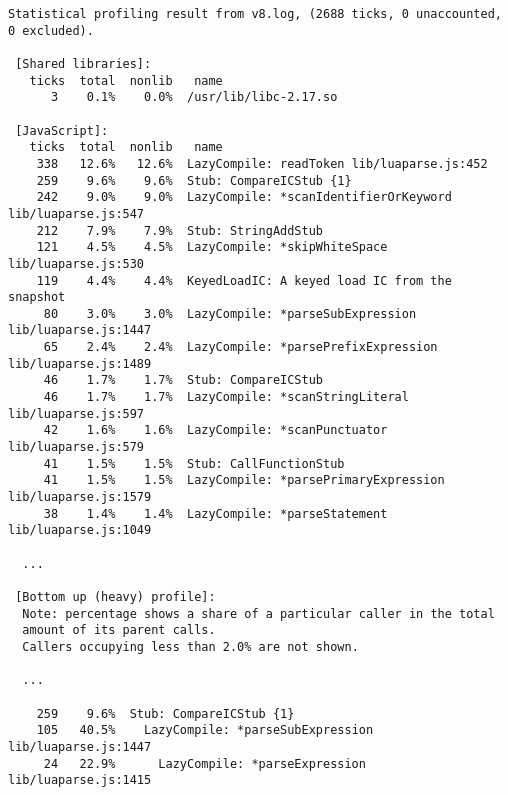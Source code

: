 \footnotesize
\begin{verbatim}
Statistical profiling result from v8.log, (2688 ticks, 0 unaccounted, 0 excluded).

 [Shared libraries]:
   ticks  total  nonlib   name
      3    0.1%    0.0%  /usr/lib/libc-2.17.so

 [JavaScript]:
   ticks  total  nonlib   name
    338   12.6%   12.6%  LazyCompile: readToken lib/luaparse.js:452
    259    9.6%    9.6%  Stub: CompareICStub {1}
    242    9.0%    9.0%  LazyCompile: *scanIdentifierOrKeyword lib/luaparse.js:547
    212    7.9%    7.9%  Stub: StringAddStub
    121    4.5%    4.5%  LazyCompile: *skipWhiteSpace lib/luaparse.js:530
    119    4.4%    4.4%  KeyedLoadIC: A keyed load IC from the snapshot
     80    3.0%    3.0%  LazyCompile: *parseSubExpression lib/luaparse.js:1447
     65    2.4%    2.4%  LazyCompile: *parsePrefixExpression lib/luaparse.js:1489
     46    1.7%    1.7%  Stub: CompareICStub
     46    1.7%    1.7%  LazyCompile: *scanStringLiteral lib/luaparse.js:597
     42    1.6%    1.6%  LazyCompile: *scanPunctuator lib/luaparse.js:579
     41    1.5%    1.5%  Stub: CallFunctionStub
     41    1.5%    1.5%  LazyCompile: *parsePrimaryExpression lib/luaparse.js:1579
     38    1.4%    1.4%  LazyCompile: *parseStatement lib/luaparse.js:1049

  ...

 [Bottom up (heavy) profile]:
  Note: percentage shows a share of a particular caller in the total
  amount of its parent calls.
  Callers occupying less than 2.0% are not shown.

  ...

    259    9.6%  Stub: CompareICStub {1}
    105   40.5%    LazyCompile: *parseSubExpression lib/luaparse.js:1447
     24   22.9%      LazyCompile: *parseExpression lib/luaparse.js:1415

\end{verbatim}
